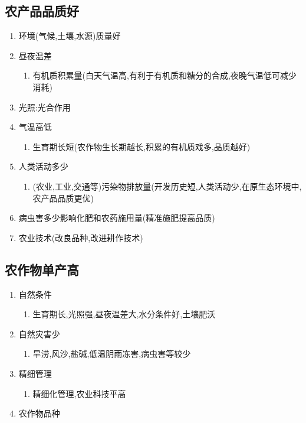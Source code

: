 \documentclass[a4paper]{article}
\begin{document}
    \subsection{农产品品质好}
    \begin{enumerate}
        \item 环境(气候,土壤,水源)质量好
        \item 昼夜温差
        \begin{enumerate}
            \item 有机质积累量(白天气温高,有利于有机质和糖分的合成,夜晚气温低可减少消耗)
        \end{enumerate}
        \item 光照:光合作用
        \item 气温高低
        \begin{enumerate}
            \item 生育期长短(农作物生长期越长,积累的有机质戏多,品质越好)
        \end{enumerate}
        \item 人类活动多少
        \begin{enumerate}
            \item (农业,工业,交通等)污染物排放量(开发历史短,人类活动少,在原生态环境中,农产品品质更优)
        \end{enumerate}
        \item 病虫害多少影响化肥和农药施用量(精准施肥提高品质)
        \item 农业技术(改良品种,改进耕作技术)
    \end{enumerate}
    \subsection{农作物单产高}
    \begin{enumerate}
        \item 自然条件
        \begin{enumerate}
            \item 生育期长,光照强,昼夜温差大,水分条件好,土壤肥沃
        \end{enumerate}
        \item 自然灾害少
        \begin{enumerate}
            \item 旱涝,风沙,盐碱,低温阴雨冻害,病虫害等较少
        \end{enumerate}
        \item 精细管理
        \begin{enumerate}
            \item 精细化管理,农业科技平高
        \end{enumerate}
        \item 农作物品种
    \end{enumerate}
\end{document}
